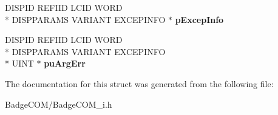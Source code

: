 \begin{DoxyCompactItemize}
\item 
\hypertarget{struct_i_badge_icon_failed_vtbl_a5ff9b18140e9230d429242d42fded0f6}{D\-I\-S\-P\-I\-D R\-E\-F\-I\-I\-D L\-C\-I\-D W\-O\-R\-D \\*
D\-I\-S\-P\-P\-A\-R\-A\-M\-S V\-A\-R\-I\-A\-N\-T E\-X\-C\-E\-P\-I\-N\-F\-O $\ast$ {\bfseries p\-Excep\-Info}}\label{struct_i_badge_icon_failed_vtbl_a5ff9b18140e9230d429242d42fded0f6}

\item 
\hypertarget{struct_i_badge_icon_failed_vtbl_ab2384d1fe33e776e65f12410ed63d33c}{D\-I\-S\-P\-I\-D R\-E\-F\-I\-I\-D L\-C\-I\-D W\-O\-R\-D \\*
D\-I\-S\-P\-P\-A\-R\-A\-M\-S V\-A\-R\-I\-A\-N\-T E\-X\-C\-E\-P\-I\-N\-F\-O \\*
U\-I\-N\-T $\ast$ {\bfseries pu\-Arg\-Err}}\label{struct_i_badge_icon_failed_vtbl_ab2384d1fe33e776e65f12410ed63d33c}

\end{DoxyCompactItemize}


The documentation for this struct was generated from the following file\-:\begin{DoxyCompactItemize}
\item 
Badge\-C\-O\-M/Badge\-C\-O\-M\-\_\-i.\-h\end{DoxyCompactItemize}

